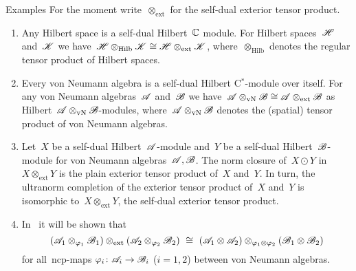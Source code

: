 \begin{parsec}
\begin{point}{Examples}%
For the moment write~$\otimes_{\text{ext}}$ for the self-dual exterior
    tensor product.
\begin{enumerate}
\item
Any Hilbert space is a self-dual Hilbert~$\mathbb{C}$ module.
For Hilbert spaces~$\mathscr{H}$ and~$\mathscr{K}$
    we have~$\mathscr{H} \otimes_{\text{Hilb}} \mathscr{K}
        \cong \mathscr{H} \otimes_{\text{ext}} \mathscr{K}$,
    where~$\otimes_{\text{Hilb}}$ denotes the regular tensor product of
    Hilbert spaces.
\item
Every von Neumann algebra is a self-dual Hilbert C$^*$-module
    over itself.
For any von Neumann algebras~$\mathscr{A}$ and~$\mathscr{B}$
    we have~$\mathscr{A}\otimes_{\text{vN}} \mathscr{B}
        \cong \mathscr{A} \otimes_{\text{ext}} \mathscr{B}$
        as Hilbert~$\mathscr{A}\otimes_{\text{vN}} \mathscr{B}$-modules,
        where~$\mathscr{A}\otimes_{\text{vN}}\mathscr{B}$ denotes the (spatial)
        tensor product of von Neumann algebras.
\item
Let~$X$ be a self-dual Hilbert~$\mathscr{A}$-module
    and~$Y$ be a self-dual Hilbert~$\mathscr{B}$-module
        for von Neumann algebras~$\mathscr{A},\mathscr{B}$.
The norm closure of~$X\odot Y$
    in~$X \otimes_{\text{ext}} Y$
        is the plain exterior tensor product of~$X$ and~$Y$.
In turn, the ultranorm completion of the exterior tensor product
    of~$X$ and~$Y$ is isomorphic to~$X \otimes_{\text{ext}} Y$,
        the self-dual exterior tensor product.
\item
In~ it will be shown that
\begin{equation*}
(\scrA_1 \otimes_{\varphi_1} \scrB_1)
    \otimes_{\text{ext}} (\scrA_2 \otimes_{\varphi_2} \scrB_2)
\ \cong \ 
(\scrA_1 \otimes \scrA_2) \otimes_{\varphi_1\otimes \varphi_2} (\scrB_1 \otimes \scrB_2)
\end{equation*}
        for all~ncp-maps $\varphi_i\colon \mathscr{A}_i \to \mathscr{B}_i$ ($i=1,2$)
    between von Neumann algebras.
\end{enumerate}
\end{point}
\end{parsec}
